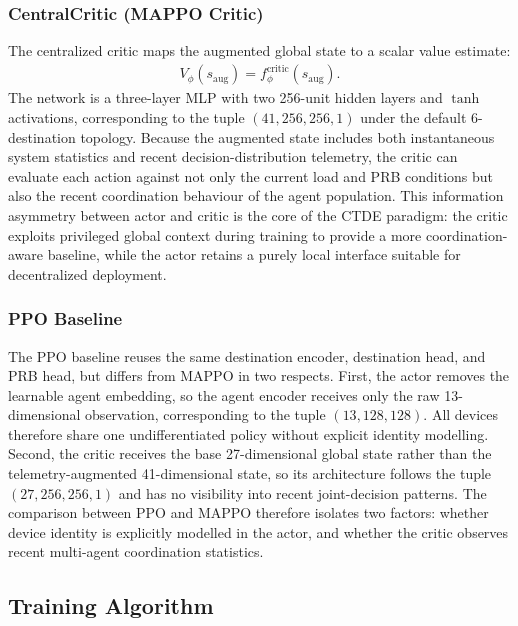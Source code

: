 \subsubsection{CentralCritic (MAPPO Critic)}

The centralized critic maps the augmented global state to a scalar value estimate:
\begin{align}
V_{\phi}(s_{\mathrm{aug}}) = f_{\phi}^{\mathrm{critic}}(s_{\mathrm{aug}}).
\end{align}
The network is a three-layer MLP with two 256-unit hidden layers and \(\tanh\) activations, corresponding to the tuple \((41, 256, 256, 1)\) under the default 6-destination topology. Because the augmented state includes both instantaneous system statistics and recent decision-distribution telemetry, the critic can evaluate each action against not only the current load and PRB conditions but also the recent coordination behaviour of the agent population. This information asymmetry between actor and critic is the core of the CTDE paradigm: the critic exploits privileged global context during training to provide a more coordination-aware baseline, while the actor retains a purely local interface suitable for decentralized deployment.

\subsubsection{PPO Baseline}

The PPO baseline reuses the same destination encoder, destination head, and PRB head, but differs from MAPPO in two respects. First, the actor removes the learnable agent embedding, so the agent encoder receives only the raw 13-dimensional observation, corresponding to the tuple \((13, 128, 128)\). All devices therefore share one undifferentiated policy without explicit identity modelling. Second, the critic receives the base 27-dimensional global state rather than the telemetry-augmented 41-dimensional state, so its architecture follows the tuple \((27, 256, 256, 1)\) and has no visibility into recent joint-decision patterns. The comparison between PPO and MAPPO therefore isolates two factors: whether device identity is explicitly modelled in the actor, and whether the critic observes recent multi-agent coordination statistics.

\subsection{Training Algorithm}
\label{subsec:training-algorithm}


